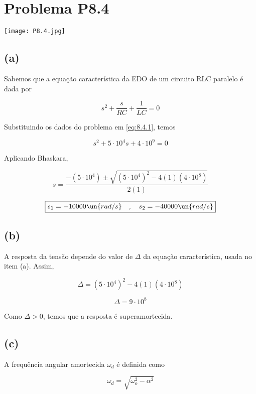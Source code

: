 
\section*{Problema P8.4}

\renewcommand*\thesection{8.4}

\begin{center}
    \texttt{[image: P8.4.jpg]}
\end{center}

\subsection*{(a)}

Sabemos que a equação característica da EDO de um circuito RLC paralelo é dada por   

\begin{equation}\label{eq:8.4.1}
    s^2 + \frac{s}{RC} + \frac{1}{LC} = 0
\end{equation}

Substituindo os dados do problema em \eqref{eq:8.4.1}, temos    

\[ s^2 + 5 \cdot 10^4 s + 4 \cdot 10^9 = 0 \]

Aplicando Bhaskara,  

\[ s = \frac{-(5 \cdot 10^4) \pm \sqrt{(5 \cdot 10^4)^2 - 4(1)(4 \cdot 10^8)}}{2(1)} \]

\[ \boxed{s_1 = -10000 \un{rad/s} \quad , \quad s_2 = -40000 \un{rad/s} }  \]

\subsection*{(b)}

A resposta da tensão depende do valor de $\Delta$ da equação característica, usada no item (a). Assim,   

\[ \Delta = (5 \cdot 10^4)^2 - 4(1)(4 \cdot 10^8) \]

\[ \Delta = 9 \cdot 10^{8} \]

Como $\Delta > 0$, temos que a resposta é superamortecida.

\subsection*{(c)}

A frequência angular amortecida $\omega_d$ é definida como  

\begin{equation}\label{eq:8.4.2}
    \omega_d = \sqrt{\omega_o^2 - \alpha^2}
\end{equation}

